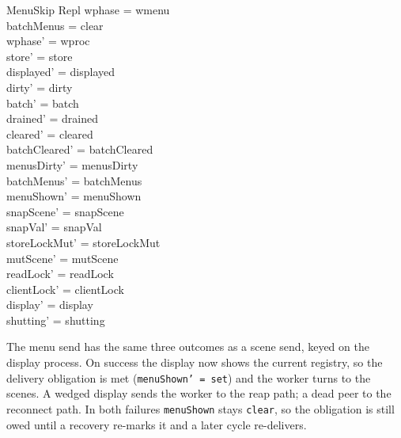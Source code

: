 \documentclass[a4paper,10pt,fleqn]{article}
\begin{document}
\begin{schema}{MenuSkip}
  \Delta Repl
\where
  wphase = wmenu \\
  batchMenus = clear \\
  wphase' = wproc \\
  store' = store \\
  displayed' = displayed \\
  dirty' = dirty \\
  batch' = batch \\
  drained' = drained \\
  cleared' = cleared \\
  batchCleared' = batchCleared \\
  menusDirty' = menusDirty \\
  batchMenus' = batchMenus \\
  menuShown' = menuShown \\
  snapScene' = snapScene \\
  snapVal' = snapVal \\
  storeLockMut' = storeLockMut \\
  mutScene' = mutScene \\
  readLock' = readLock \\
  clientLock' = clientLock \\
  display' = display \\
  shutting' = shutting
\end{schema}

The menu send has the same three outcomes as a scene send, keyed on the
display process.  On success the display now shows the current registry, so
the delivery obligation is met (\texttt{menuShown' = set}) and the worker
turns to the scenes.  A wedged display sends the worker to the reap path; a
dead peer to the reconnect path.  In both failures \texttt{menuShown} stays
\texttt{clear}, so the obligation is still owed until a recovery re-marks it
and a later cycle re-delivers.
\end{document}
